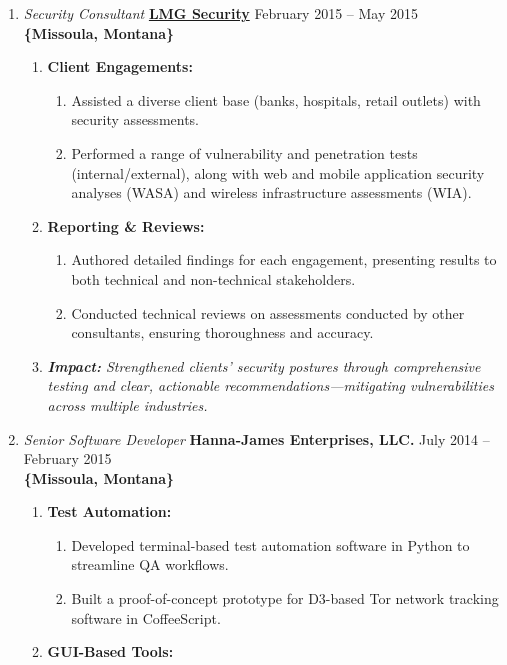 \documentclass[oneside]{article}%
\begin{document}
\begin{enumerate}[]
\begin{enumerate}[]
	\end{enumerate}
	\item \textit{Security Consultant} \textbf{\href{https://lmgsecurity.com/}{LMG Security}} \hfill February 2015 -- May 2015\\
	\textbf{\{Missoula, Montana\}}
	\begin{enumerate}[]
		\item \textbf{Client Engagements:}
			\begin{enumerate}[-]
				\item Assisted a diverse client base (banks, hospitals, retail outlets) with security assessments.
				\item Performed a range of vulnerability and penetration tests (internal/external), along with web and mobile application security analyses (WASA) and wireless infrastructure assessments (WIA).
			\end{enumerate}
		\item \textbf{Reporting \& Reviews:}
			\begin{enumerate}[-]
				\item Authored detailed findings for each engagement, presenting results to both technical and non-technical stakeholders.
				\item Conducted technical reviews on assessments conducted by other consultants, ensuring thoroughness and accuracy.
			\end{enumerate}
		\item \textit{\textbf{Impact:} Strengthened clients’ security postures through comprehensive testing and clear, actionable recommendations—mitigating vulnerabilities across multiple industries.}
	\end{enumerate}
	\item \textit{Senior Software Developer} \textbf{Hanna-James Enterprises, LLC.} \hfill July 2014 -- February 2015\\
	\textbf{\{Missoula, Montana\}}
	\begin{enumerate}[]
		\item \textbf{Test Automation:}
			\begin{enumerate}[-]
				\item Developed terminal-based test automation software in Python to streamline QA workflows.
				\item Built a proof-of-concept prototype for D3-based Tor network tracking software in CoffeeScript.
			\end{enumerate}
		\item \textbf{GUI-Based Tools:}

\end{enumerate}
\end{enumerate}
\end{document}
